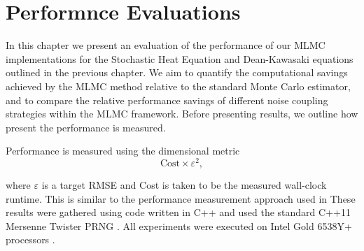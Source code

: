 \chapter{Performnce Evaluations}\label{chap:performance}

In this chapter we present an evaluation of the 
performance of our MLMC implementations for the Stochastic Heat Equation 
and Dean-Kawasaki equations outlined in the previous chapter. 
We aim to quantify the computational savings achieved by the MLMC 
method relative to the standard Monte Carlo estimator, 
and to compare the relative performance savings of different
noise coupling strategies within the MLMC framework.
Before presenting results, we outline how present the performance
is measured.

Performance is measured using the dimensional metric 
$$
\mathrm{Cost} \times \varepsilon^2,
$$ 

where $\varepsilon$ is a target RMSE and Cost is taken to be the measured wall-clock runtime.
This is similar to the performance measurement approach used in 
These results were gathered using code written in C++ 
and used the standard C++11 Mersenne 
Twister PRNG \cite{cpp20standard}. All experiments were executed 
on Intel Gold 6538Y+ processors \cite{intel_xeon_gold_6538y}.

